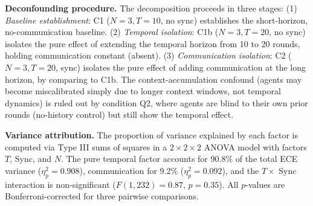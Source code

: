 \documentclass[11pt]{article}
\theoremstyle{definition}
\theoremstyle{remark}
\begin{document}
\textbf{Deconfounding procedure.} The decomposition proceeds in three stages: (1) \textit{Baseline establishment}: C1 ($N{=}3, T{=}10$, no sync) establishes the short-horizon, no-communication baseline. (2) \textit{Temporal isolation}: C1b ($N{=}3, T{=}20$, no sync) isolates the pure effect of extending the temporal horizon from 10 to 20 rounds, holding communication constant (absent). (3) \textit{Communication isolation}: C2 ($N{=}3, T{=}20$, sync) isolates the pure effect of adding communication at the long horizon, by comparing to C1b. The context-accumulation confound (agents may become miscalibrated simply due to longer context windows, not temporal dynamics) is ruled out by condition Q2, where agents are blind to their own prior rounds (no-history control) but still show the temporal effect.

\textbf{Variance attribution.} The proportion of variance explained by each factor is computed via Type III sums of squares in a $2 \times 2 \times 2$ ANOVA model with factors $T$, Sync, and $N$. The pure temporal factor accounts for 90.8\% of the total ECE variance ($\eta^2_p = 0.908$), communication for 9.2\% ($\eta^2_p = 0.092$), and the $T \times$ Sync interaction is non-significant ($F(1,232) = 0.87$, $p = 0.35$). All $p$-values are Bonferroni-corrected for three pairwise comparisons.
\end{document}
